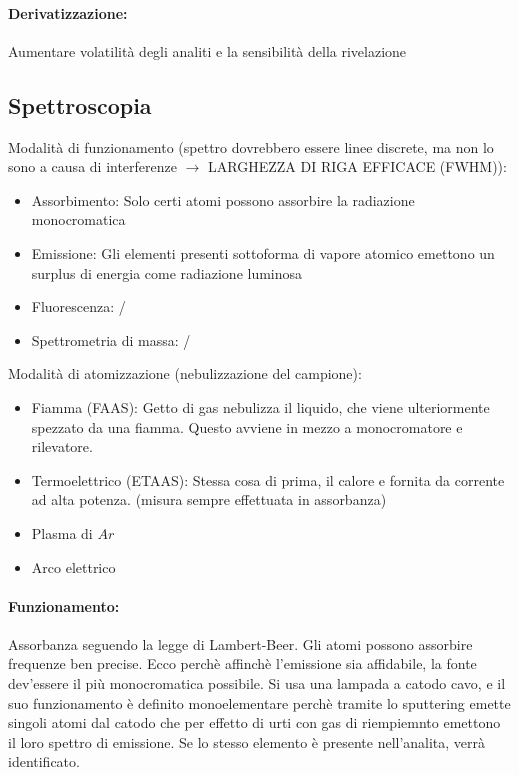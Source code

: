 \documentclass{article}
\begin{document}
\paragraph{Derivatizzazione: } Aumentare volatilità degli analiti e la sensibilità della rivelazione

\newpage

\subsection{Spettroscopia}
Modalità di funzionamento (spettro dovrebbero essere linee discrete, ma non lo sono a causa di interferenze $\rightarrow$ LARGHEZZA DI RIGA EFFICACE (FWHM)):
\begin{itemize}
	\item Assorbimento: Solo certi atomi possono assorbire la radiazione monocromatica
	\item Emissione: Gli elementi presenti sottoforma di vapore atomico emettono un surplus di energia come radiazione luminosa
	\item Fluorescenza: /
	\item Spettrometria di massa: /
\end{itemize}
Modalità di atomizzazione (nebulizzazione del campione):
\begin{itemize}
	\item Fiamma (FAAS): Getto di gas nebulizza il liquido, che viene ulteriormente spezzato da una fiamma. Questo avviene in mezzo a monocromatore e rilevatore.
	\item Termoelettrico (ETAAS): Stessa cosa di prima, il calore e fornita da corrente ad alta potenza. (misura sempre effettuata in assorbanza)
	\item Plasma di $Ar$
	\item Arco elettrico
\end{itemize}

\paragraph{Funzionamento: } Assorbanza seguendo la legge di Lambert-Beer. Gli atomi possono assorbire frequenze ben precise. Ecco perchè affinchè l'emissione sia affidabile, la fonte dev'essere il più monocromatica possibile. Si usa una lampada a catodo cavo, e il suo funzionamento è definito monoelementare perchè tramite lo sputtering emette singoli atomi dal catodo che per effetto di urti con gas di riempiemnto emettono il loro spettro di emissione. Se lo stesso elemento è presente nell'analita, verrà identificato.
\end{document}
